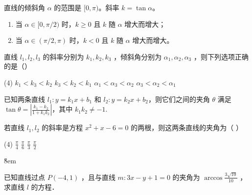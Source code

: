 \begin{theorem}[倾斜角与斜率的关系]
    直线的倾斜角 $\alpha$ 的范围是 $[0, \pi)$。斜率 $k = \tan\alpha$。
    \begin{enumerate}
        \item 当 $\alpha \in [0, \pi/2)$ 时，$k \ge 0$ 且 $k$ 随 $\alpha$ 增大而增大；
        \item 当 $\alpha \in (\pi/2, \pi)$ 时，$k < 0$ 且 $k$ 随 $\alpha$ 增大而增大。
    \end{enumerate}
\end{theorem}

\begin{example}
    直线 $l_1, l_2, l_3$ 的斜率分别为 $k_1, k_2, k_3$ ，倾斜角分别为 $\alpha_1, \alpha_2, \alpha_3$ ，则下列选项正确的是（\hspace{2em}）

    \begin{figure} [H]
        \centering
        \resizebox{0.15\textwidth}{!}{}
    \end{figure}

    \begin{tasks}(4)
        \task $k_1<k_3<k_2$
        \task $k_3<k_2<k_1$
        \task $\alpha_1<\alpha_3<\alpha_2$
        \task $\alpha_3<\alpha_2<\alpha_1$
    \end{tasks}
\end{example}

\begin{theorem}[两条直线之间的夹角公式]
    已知两条直线 $l_1: y = k_1 x + b_1$ 和 $l_2: y = k_2 x + b_2$，则它们之间的夹角 $\theta$ 满足 $\tan \theta = \left| \frac{k_1 - k_2}{1 + k_1 k_2} \right|$，其中 $k_1 k_2 \neq -1$.
\end{theorem}

\begin{example}
    若直线 $l_1, l_2$ 的斜率是方程 $x^2+x-6=0$ 的两根，则这两条直线的夹角为（ \qquad）
    \begin{tasks}(4)
        \task $\frac{\pi}{4}$
        \task $\frac{\pi}{6}$
        \task $\frac{\pi}{3}$
        \task $\frac{\pi}{2}$
    \end{tasks}
\end{example}

\v{8em}

\begin{example}
    已知直线过点 $P(-4,1)$ ，且与直线 $m: 3 x-y+1=0$ 的夹角为 $\arccos \frac{3 \sqrt{10}}{10}$ ，求直线 $l$ 的方程．
\end{example}

